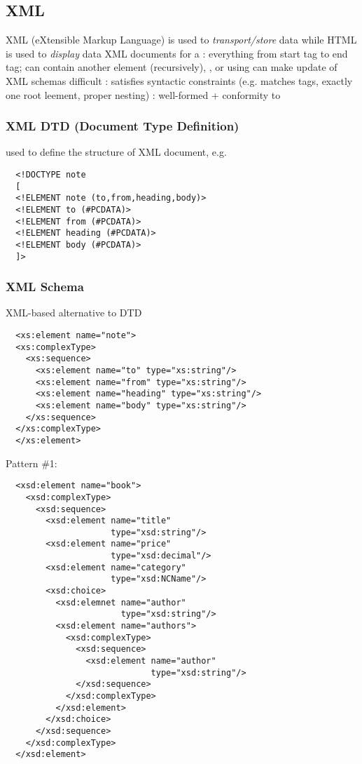\documentclass{myproc}
\begin{document}
\subsection{XML}
\bit
\w XML (eXtensible Markup Language) is used to {\em transport/store\/} data
while HTML is used to {\em display\/} data
\w XML documents for a 
\w {}: everything from start tag to end tag; can contain
   \ben
   \w another element (recursively),
   \w {}, or
   \w {}
   \een
\w using  can make update of XML schemas difficult
\w {}: satisfies syntactic constraints
(e.g. matches tags, exactly one root leement, proper nesting)
\w {}: well-formed + conformity to 
\eit

\subsubsection{XML DTD (Document Type Definition)}
\bit
\w used to define the structure of XML document, e.g.
{
\begin{verbatim}
  <!DOCTYPE note
  [
  <!ELEMENT note (to,from,heading,body)>
  <!ELEMENT to (#PCDATA)>
  <!ELEMENT from (#PCDATA)>
  <!ELEMENT heading (#PCDATA)>
  <!ELEMENT body (#PCDATA)>
  ]>
\end{verbatim}
}

\eit
\subsubsection{XML Schema}
\bit
\w XML-based alternative to DTD
{
\begin{verbatim}
  <xs:element name="note">
  <xs:complexType>
    <xs:sequence>
      <xs:element name="to" type="xs:string"/>
      <xs:element name="from" type="xs:string"/>
      <xs:element name="heading" type="xs:string"/>
      <xs:element name="body" type="xs:string"/>
    </xs:sequence>
  </xs:complexType>
  </xs:element>
\end{verbatim}}
\w Pattern \#1: 
  \begin{verbatim}
  <xsd:element name="book">
    <xsd:complexType>
      <xsd:sequence>
        <xsd:element name="title" 
                     type="xsd:string"/>
        <xsd:element name="price" 
                     type="xsd:decimal"/>
        <xsd:element name="category" 
                     type="xsd:NCName"/>
        <xsd:choice>
          <xsd:elemnet name="author" 
                       type="xsd:string"/>
          <xsd:element name="authors">
            <xsd:complexType>
              <xsd:sequence>
                <xsd:element name="author" 
                             type="xsd:string"/>
              </xsd:sequence>
            </xsd:complexType>
          </xsd:element>
        </xsd:choice>
      </xsd:sequence>
    </xsd:complexType>
  </xsd:element>
  \end{verbatim}
\end{document}
